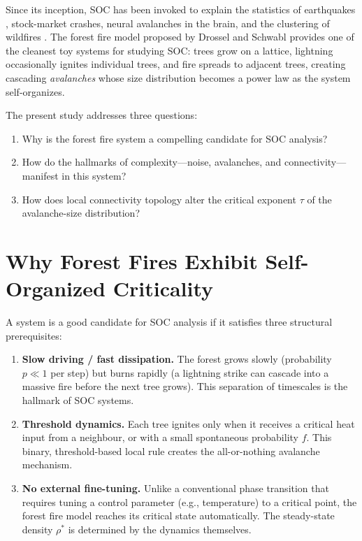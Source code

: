 \documentclass[12pt,a4paper]{article}
\begin{document}
Since its inception, SOC has been invoked to explain the statistics of
earthquakes \cite{olami1992}, stock-market crashes, neural avalanches in
the brain, and the clustering of wildfires \cite{malamud1998}. The forest
fire model proposed by Drossel and Schwabl \cite{drossel1992} provides one
of the cleanest toy systems for studying SOC: trees grow on a lattice,
lightning occasionally ignites individual trees, and fire spreads to
adjacent trees, creating cascading \emph{avalanches} whose size distribution
becomes a power law as the system self-organizes.

The present study addresses three questions:
\begin{enumerate}
  \item Why is the forest fire system a compelling candidate for SOC analysis?
  \item How do the hallmarks of complexity---noise, avalanches, and
        connectivity---manifest in this system?
  \item How does local connectivity topology alter the critical exponent
        $\tau$ of the avalanche-size distribution?
\end{enumerate}

\section{Why Forest Fires Exhibit Self-Organized Criticality}
\label{sec:why}

A system is a good candidate for SOC analysis if it satisfies three
structural prerequisites:

\begin{enumerate}
  \item \textbf{Slow driving / fast dissipation.}  The forest grows slowly
        (probability $p \ll 1$ per step) but burns rapidly (a lightning
        strike can cascade into a massive fire before the next tree grows).
        This separation of timescales is the hallmark of SOC systems.

  \item \textbf{Threshold dynamics.}  Each tree ignites only when it receives
        a critical heat input from a neighbour, or with a small spontaneous
        probability $f$.  This binary, threshold-based local rule creates the
        all-or-nothing avalanche mechanism.

  \item \textbf{No external fine-tuning.}  Unlike a conventional
        phase transition that requires tuning a control parameter (e.g.,
        temperature) to a critical point, the forest fire model reaches its
        critical state automatically.  The steady-state density
        $\rho^*$ is determined by the dynamics themselves.
\end{enumerate}
\end{document}

